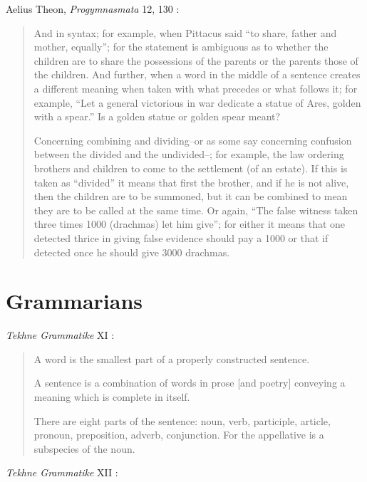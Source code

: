 \documentclass{article}
\begin{document}
Aelius Theon, {\em Progymnasmata} 12, 130 \cite[p.~63]{progymnasmata}:

\begin{quote}
And in syntax; for example, when Pittacus said ``to share, father and mother, equally''; for the statement is ambiguous as to whether the children are to share the possessions of the parents or the parents those of the children. And further, when a word in the middle of a sentence creates a different meaning when taken with what precedes or what follows it; for example, ``Let a general victorious in war dedicate a statue of Ares, golden with a spear.'' Is a golden statue or golden spear meant?

Concerning combining and dividing--or as some say concerning confusion between the divided and the undivided--; for example, the law ordering brothers and children to
come to the settlement (of an estate). If this is taken as ``divided'' it means that first the brother, and if he is not alive, then the children are to be summoned, but it can be
combined to mean they are to be called at the same time. Or again, ``The false witness taken three times 1000 (drachmas) let him give'';
for either it means that one detected thrice in giving false evidence should pay a 1000 or that if detected once he should give 3000 drachmas.
\end{quote}















\section{Grammarians}
{\em Tekhne Grammatike} XI \cite[p.~176]{tekhne}:

\begin{quote}
A word is the smallest part of a properly constructed sentence.

A sentence is a combination of words in prose [and poetry] conveying a meaning which is complete in itself.

There are eight parts of the sentence: noun, verb, participle, article,
pronoun, preposition, adverb, conjunction. For the appellative is a subspecies
of the noun. 
\end{quote}

{\em Tekhne Grammatike} XII \cite[p.~176]{tekhne}:
\end{document}
